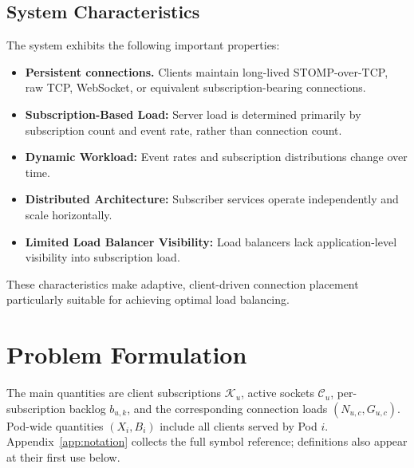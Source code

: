 \documentclass[manuscript]{acmart}
\begin{document}
\subsection{System Characteristics}

The system exhibits the following important properties:

\begin{itemize}
	
	\item \textbf{Persistent connections.} Clients maintain long-lived STOMP-over-TCP,
	raw TCP, WebSocket, or equivalent subscription-bearing connections.
	
	\item \textbf{Subscription-Based Load:} Server load is determined primarily by subscription count and event rate, rather than connection count.
	
	\item \textbf{Dynamic Workload:} Event rates and subscription distributions change over time.
	
	\item \textbf{Distributed Architecture:} Subscriber services operate independently and scale horizontally.
	
	\item \textbf{Limited Load Balancer Visibility:} Load balancers lack application-level visibility into subscription load.
	
\end{itemize}

These characteristics make adaptive, client-driven connection placement particularly suitable for achieving optimal load balancing.




\section{Problem Formulation}
\label{sec:problem-formulation}

The main quantities are client subscriptions $\mathcal{K}_u$, active sockets
$\mathcal{C}_u$, per-subscription backlog $b_{u,k}$, and the corresponding
connection loads $(N_{u,c},G_{u,c})$. Pod-wide quantities $(X_i,B_i)$ include
all clients served by Pod $i$. Appendix~\ref{app:notation} collects the full
symbol reference; definitions also appear at their first use below.
\end{document}
